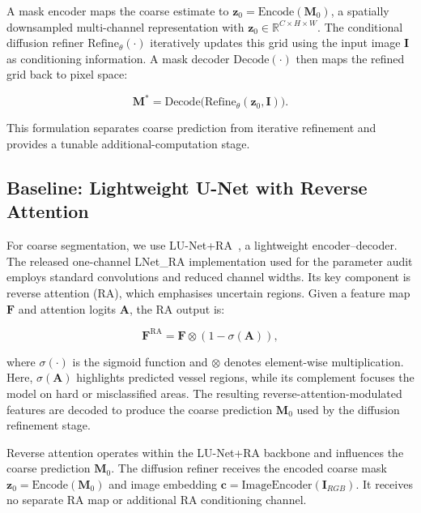\documentclass[jimaging,article,submit,pdftex,moreauthors]{Definitions/mdpi}%
\begin{document}
A mask encoder maps the coarse estimate to $\mathbf{z}_0=\mathrm{Encode}(\mathbf{M}_0)$, a spatially downsampled multi-channel representation with $\mathbf{z}_0\in\mathbb{R}^{C\times H\times W}$. The conditional diffusion refiner $\mathrm{Refine}_{\theta}(\cdot)$ iteratively updates this grid using the input image $\mathbf{I}$ as conditioning information. A mask decoder $\mathrm{Decode}(\cdot)$ then maps the refined grid back to pixel space:

\begin{equation}
\mathbf{M}^* = \mathrm{Decode}\big(\mathrm{Refine}_{\theta}(\mathbf{z}_0, \mathbf{I})\big).
\end{equation}



This formulation separates coarse prediction from iterative refinement and provides a tunable additional-computation stage.



\subsection{Baseline: Lightweight U-Net with Reverse Attention}



For coarse segmentation, we use LU-Net+RA~\cite{Hernandez2025}, a lightweight encoder--decoder. The released one-channel LNet\_RA implementation used for the parameter audit employs standard convolutions and reduced channel widths. Its key component is reverse attention (RA), which emphasises uncertain regions. Given a feature map $\mathbf{F}$ and attention logits $\mathbf{A}$, the RA output is:

\begin{equation}
\mathbf{F}^{\text{RA}} = \mathbf{F}\otimes \left(1-\sigma(\mathbf{A})\right),
\end{equation}

where $\sigma(\cdot)$ is the sigmoid function and $\otimes$ denotes element-wise multiplication. Here, $\sigma(\mathbf{A})$ highlights predicted vessel regions, while its complement focuses the model on hard or misclassified areas. The resulting reverse-attention-modulated features are decoded to produce the coarse prediction $\mathbf{M}_0$ used by the diffusion refinement stage.



Reverse attention operates within the LU-Net+RA backbone and influences the coarse prediction $\mathbf{M}_0$. The diffusion refiner receives the encoded coarse mask $\mathbf{z}_0=\mathrm{Encode}(\mathbf{M}_0)$ and image embedding $\mathbf{c}=\mathrm{ImageEncoder}(\mathbf{I}_{RGB})$. It receives no separate RA map or additional RA conditioning channel.
\end{document}
